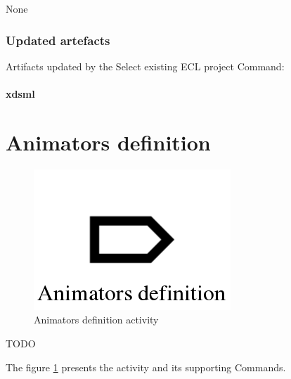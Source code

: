 \documentclass{gemoc} %
\begin{document}
	None
\subsubsection{Updated artefacts}
Artifacts updated by the Select existing ECL project Command:
\paragraph{xdsml} 


\section{Animators definition}
\label{sec:Animators_definition}
\begin{figure}[h!]
		\center
		\includegraphics*[trim=0.0cm 0.0cm 0cm 0.0cm, clip=true]{fig/Animators_definition}
		\caption{Animators definition activity}
		\label{fig:Animators_definition}
\end{figure}

TODO

The figure \ref{fig:Animators_definition} presents the activity and its supporting Commands.


\end{document}
